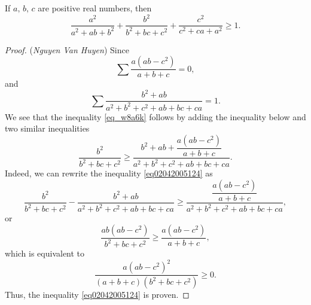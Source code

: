 \documentclass[12pt,a4paper]{book}
\begin{document}
\begin{pro_no_count}
If $a,\,b,\,c$ are positive real numbers, then
\begin{equation}\label{eq_w8a6k}
\frac{a^2}{a^2+ab+b^2} + \frac{b^2}{b^2+bc+c^2} + \frac{c^2}{c^2+ca+a^2} \ge 1.
\end{equation}
\end{pro_no_count}

\begin{proof}
(\textit{Nguyen Van Huyen}) Since
\[\sum \dfrac{a(ab-c^2)}{a+b+c} = 0,\]
and
\[\sum \frac{b^2+ab}{a^2+b^2+c^2+ab+bc+ca} = 1.\]
We see that the inequality \eqref{eq_w8a6k} follows by adding the inequality below and two similar inequalities
\begin{equation}\label{eq02042005124}
\frac{b^2}{b^2+bc+c^2} \ge \frac{b^2+ab+\dfrac{a(ab-c^2)}{a+b+c}}{a^2+b^2+c^2+ab+bc+ca}.
\end{equation}
Indeed, we can rewrite the inequality \eqref{eq02042005124} as
\[\frac{b^2}{b^2+bc+c^2} -  \frac{b^2+ab}{a^2+b^2+c^2+ab+bc+ca} \ge \frac{\dfrac{a(ab-c^2)}{a+b+c}}{a^2+b^2+c^2+ab+bc+ca},\]
or
\[\frac{ab(ab-c^2)}{b^2+bc+c^2} \ge \frac{a(ab-c^2)}{a+b+c},\]
which is equivalent to
\[\frac{a(ab-c^2)^2}{(a+b+c)(b^2+bc+c^2)} \ge 0.\]
Thus, the inequality \eqref{eq02042005124} is proven.
%
\end{proof}
\end{document}
